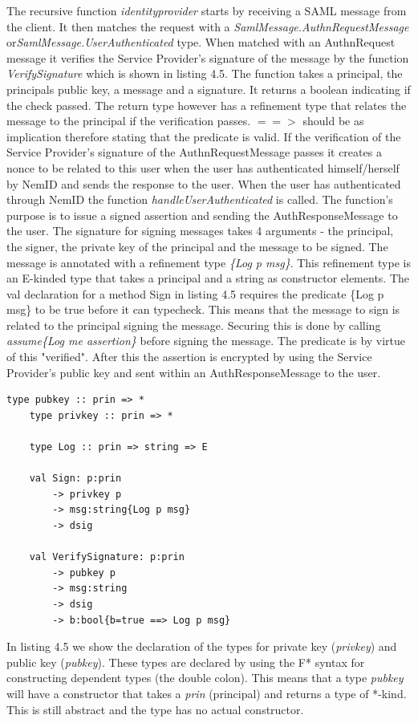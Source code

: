 \documentclass[twosided]{report}
\begin{document}
The recursive function \emph{identityprovider} starts by receiving a SAML message from the client. It then matches the request with a \emph{SamlMessage.AuthnRequestMessage} or\emph{SamlMessage.UserAuthenticated} type. When matched with an AuthnRequest message it verifies the Service Provider's signature of the message by the function \emph{VerifySignature} which is shown in listing 4.5. The function takes a principal, the principals public key, a message and a signature. It returns a boolean indicating if the check passed. The return type however has a refinement type that relates the message to the principal if the verification passes. $==>$ should be as implication therefore stating that the predicate is valid. If the verification of the Service Provider's signature of the AuthnRequestMessage passes it creates a nonce to be related to this user when the user has authenticated himself/herself by NemID and sends the response to the user. When the user has authenticated through NemID the function \emph{handleUserAuthenticated} is called. The function's purpose is to issue a signed assertion and sending the AuthResponseMessage to the user. The signature for signing messages takes 4 arguments - the principal, the signer, the private key of the principal and the message to be signed. The message is annotated with a refinement type \emph{\{Log p msg\}}. This refinement type is an E-kinded type that takes a principal and a string as constructor elements. The val declaration for a method Sign in listing 4.5 requires the predicate \{Log p msg\} to be true before it can typecheck. This means that the message to sign is related to the principal signing the message. Securing this is done by calling \emph{assume\{Log me assertion\}} before signing the message. The predicate is by virtue of this "verified". After this the assertion is encrypted by using the Service Provider's public key and sent within an AuthResponseMessage to the user.

\begin{lstlisting}[style=fstar, caption={Cryptographic elements}]
	type pubkey :: prin => *
	type privkey :: prin => *

	type Log :: prin => string => E
	
	val Sign: p:prin
		-> privkey p
		-> msg:string{Log p msg}
		-> dsig

	val VerifySignature: p:prin
		-> pubkey p 	
		-> msg:string
		-> dsig
		-> b:bool{b=true ==> Log p msg}
\end{lstlisting}

In listing 4.5 we show the declaration of the types for private key (\emph{privkey}) and public key (\emph{pubkey}). These types are declared by using the F* syntax for constructing dependent types (the double colon). This means that a type \emph{pubkey} will have a constructor that takes a \emph{prin} (principal) and returns a type of *-kind. This is still abstract and the type has no actual constructor.
\end{document}
